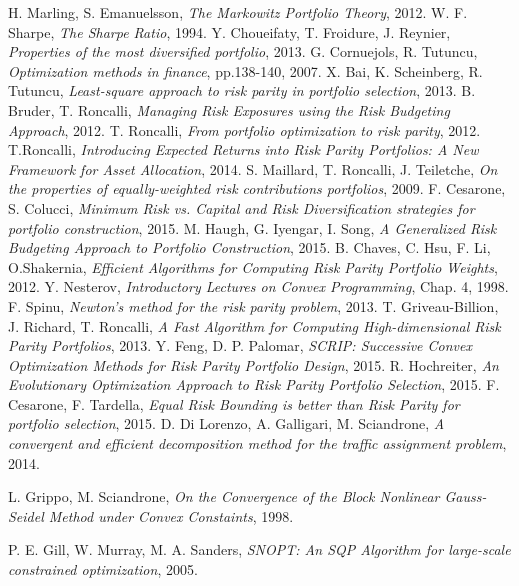  H. Marling, S. Emanuelsson,
  \emph{The Markowitz Portfolio Theory},
  2012.
  W. F. Sharpe,
  \emph{The Sharpe Ratio},
  1994.
  Y. Choueifaty, T. Froidure, J. Reynier,
  \emph{Properties of the most diversified portfolio},
  2013. 
  G. Cornuejols, R. Tutuncu,
  \emph{Optimization methods in finance}, pp.138-140,
   2007.
  X. Bai, K. Scheinberg, R. Tutuncu,
  \emph{Least-square approach to risk parity in portfolio selection},
  2013.   
  B. Bruder, T. Roncalli,
  \emph{Managing Risk Exposures using the Risk Budgeting Approach},
  2012.   
  T. Roncalli,
  \emph{From portfolio optimization to risk parity},
  2012.
  T.Roncalli,
  \emph{Introducing Expected Returns into Risk Parity Portfolios: A New Framework for Asset Allocation},
  2014.   
  S. Maillard, T. Roncalli, J. Teiletche,
  \emph{On the properties of equally-weighted risk contributions portfolios},
  2009.
  F. Cesarone, S. Colucci,
  \emph{Minimum Risk vs. Capital and Risk Diversification strategies for portfolio construction},
  2015. 
  M. Haugh, G. Iyengar, I. Song, 
  \emph{A Generalized Risk Budgeting Approach to Portfolio Construction},
  2015.
  B. Chaves, C. Hsu, F. Li, O.Shakernia,
  \emph{Efficient Algorithms for Computing Risk Parity Portfolio Weights},
  2012.
  Y. Nesterov,
  \emph{Introductory Lectures on Convex Programming}, Chap. 4,
  1998.
  F. Spinu,
  \emph{Newton's method for the risk parity problem},
  2013.
  T. Griveau-Billion, J. Richard, T. Roncalli,
  \emph{A Fast Algorithm for Computing High-dimensional Risk Parity Portfolios},
  2013.
  Y. Feng, D. P. Palomar,
  \emph{SCRIP: Successive Convex Optimization Methods for Risk Parity Portfolio Design},
  2015.
   R. Hochreiter,
  \emph{An Evolutionary Optimization Approach to Risk Parity Portfolio Selection},
  2015.  
  F. Cesarone, F. Tardella,		
  \emph{Equal Risk Bounding is better than Risk Parity for portfolio selection},
  2015.
D. Di Lorenzo, A. Galligari, M. Sciandrone,
  \emph{A convergent and efficient decomposition method for the traffic assignment problem},
  2014.   
  
L. Grippo, M. Sciandrone,
\emph{On the Convergence of the Block
Nonlinear Gauss-Seidel Method under Convex Constaints},
1998.

	P. E. Gill, W. Murray, M. A. Sanders,
	\emph{SNOPT: An SQP Algorithm for large-scale constrained optimization}, 
	2005.